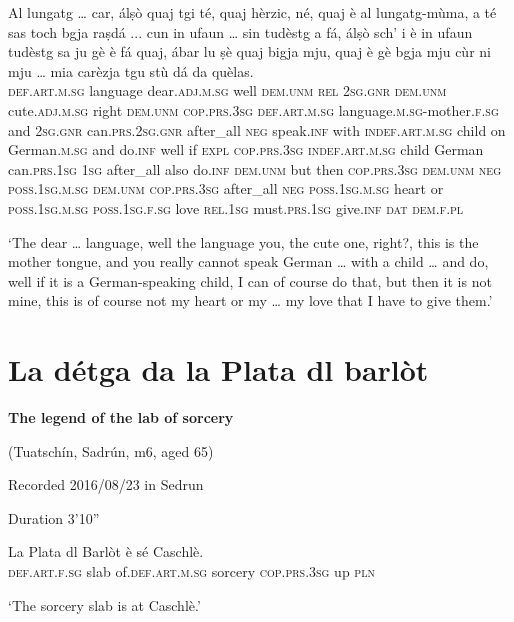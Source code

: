 \begin{linenumbers}
\gll    Al lungatg … car, álṣò quaj tgi té, quaj hèrzic, né, quaj è al lungatg-mùma, a té sas toch bgja raṣdá ... cun in ufaun … sin tudèstg a fá, álṣò sch’ i è in ufaun tudèstg sa ju gè è fá quaj, ábar lu ṣè quaj bigja mju, quaj è gè bgja mju cùr ni mju … mia carèzja tgu stù dá da quèlas.\\ 
 \textsc{def.art.m.sg} language {} dear.\textsc{adj.m.sg} well \textsc{dem.unm} \textsc{rel} \textsc{2sg.gnr} \textsc{dem.unm} cute.\textsc{adj.m.sg} right \textsc{dem.unm} \textsc{cop.prs.3sg} \textsc{def.art.m.sg} language.\textsc{m.sg}-mother.\textsc{f.sg} and \textsc{2sg.gnr} can.\textsc{prs.2sg.gnr} after\_all \textsc{neg} speak.\textsc{inf} {} with \textsc{indef.art.m.sg} child {} on German.\textsc{m.sg} and do.\textsc{inf} well if \textsc{expl} \textsc{cop.prs.3sg} \textsc{indef.art.m.sg} child German can.\textsc{prs.1sg} \textsc{1sg} after\_all also do.\textsc{inf} \textsc{dem.unm} but then \textsc{cop.prs.3sg} \textsc{dem.unm} \textsc{neg} \textsc{poss.1sg.m.sg} \textsc{dem.unm} \textsc{cop.prs.3sg} after\_all \textsc{neg} \textsc{poss.1sg.m.sg} heart or \textsc{poss.1sg.m.sg} {} \textsc{poss.1sg.f.sg} love \textsc{rel.1sg} must.\textsc{prs.1sg} give.\textsc{inf} \textsc{dat} \textsc{dem.f.pl}\\
\end{linenumbers}
\medskip
\glt `The dear … language, well the language you, the cute one, right?, this is the mother tongue, and you really cannot speak German … with a child … and do, well if it is a German-speaking child, I can of course do that, but then it is not mine, this is of course not my heart or my … my love that I have to give them.'
\medskip


\section{La détga da la Plata dl barlòt}

\noindent
\textbf{The legend of the lab of sorcery}

\noindent
(Tuatschín, Sadrún, m6, aged 65)

\noindent
Recorded 2016/08/23 in Sedrun

\noindent
Duration 3'10''

\bigskip

\begin{linenumbers}
\gll    La Plata dl Barlòt è sé Caschlè.\\
 \textsc{def.art.f.sg} slab of.\textsc{def.art.m.sg} sorcery \textsc{cop.prs.3sg} up \textsc{pln}\\
\end{linenumbers}
\medskip
\glt `The sorcery slab is at Caschlè.'
\medskip

